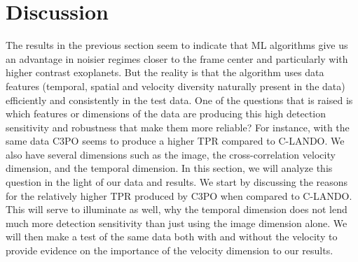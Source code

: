 \documentclass{aa}
\begin{document}

\section{Discussion}
\label{sec:discussion}

The results in the previous section seem to indicate that ML algorithms give us an advantage in noisier regimes closer to the frame center and particularly with higher contrast exoplanets.
But the reality is that the algorithm uses data features (temporal, spatial and velocity diversity naturally present in the data) efficiently and consistently in the test data.
One of the questions that is raised is which features or dimensions of the data are producing this high detection sensitivity and robustness that make them more reliable?
For instance, with the same data C3PO seems to produce a higher TPR compared to C-LANDO.
We also have several dimensions such as the image, the cross-correlation velocity dimension, and the temporal dimension.
In this section, we will analyze this question in the light of our data and results.
We start by discussing the reasons for the relatively higher TPR produced by C3PO when compared to C-LANDO.
This will serve to illuminate as well, why the temporal dimension does not lend much more detection sensitivity than just using the image dimension alone.
We will then make a test of the same data both with and without the velocity to provide evidence on the importance of the velocity dimension to our results.
\end{document}
